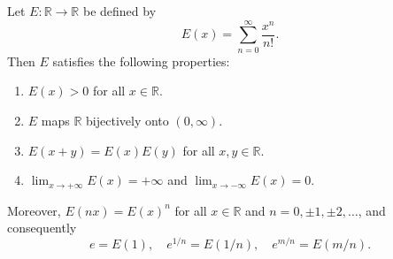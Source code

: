 Let $E: \mathbb{R} \to \mathbb{R}$ be defined by
$$E(x) = \sum_{n=0}^{\infty} \frac{x^n}{n!}.$$
Then $E$ satisfies the following properties:
\begin{enumerate}
\item[(a)] $E(x) > 0$ for all $x \in \mathbb{R}$.
\item[(b)] $E$ maps $\mathbb{R}$ bijectively onto $(0, \infty)$.
\item[(c)] $E(x+y) = E(x)E(y)$ for all $x, y \in \mathbb{R}$.
\item[(d)] $\displaystyle\lim_{x \to +\infty} E(x) = +\infty$ and $\displaystyle\lim_{x \to -\infty} E(x) = 0$.
\end{enumerate}
Moreover, $E(nx) = E(x)^n$ for all $x \in \mathbb{R}$ and $n = 0, \pm 1, \pm 2, \dots$, and consequently
$$e = E(1), \quad e^{1/n} = E(1/n), \quad e^{m/n} = E(m/n).$$
